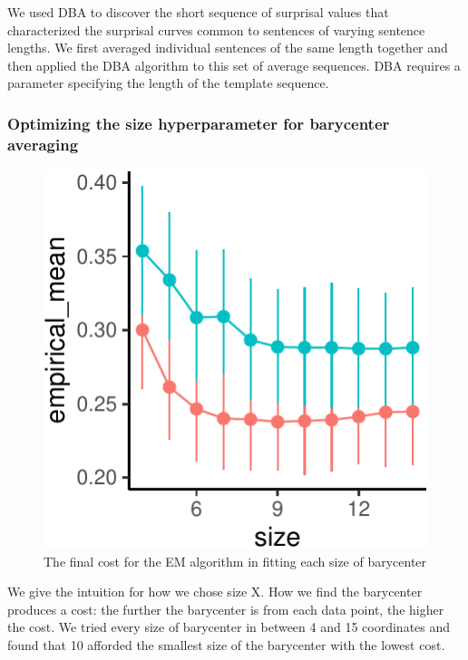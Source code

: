 \documentclass[man,floatsintext]{apa6}
\begin{document}
We used DBA to discover the short sequence of surprisal values that characterized the surprisal curves common to sentences of varying sentence lengths. We first averaged individual sentences of the same length together and then applied the DBA algorithm to this set of average sequences. DBA requires a parameter specifying the length of the template sequence.

\hypertarget{optimizing-the-size-hyperparameter-for-barycenter-averaging}{%
\subsubsection{Optimizing the size hyperparameter for barycenter averaging}\label{optimizing-the-size-hyperparameter-for-barycenter-averaging}}

\begin{figure}[tb]

{\centering \includegraphics{figs/plotting-barycenters-1} 

}

\caption{The final cost for the EM algorithm in fitting each size of barycenter}\label{fig:plotting-barycenters}
\end{figure}

We give the intuition for how we chose size X. How we find the barycenter produces a cost: the further the barycenter is from each data point, the higher the cost. We tried every size of barycenter in between 4 and 15 coordinates and found that 10 afforded the smallest size of the barycenter with the lowest cost.
\end{document}
